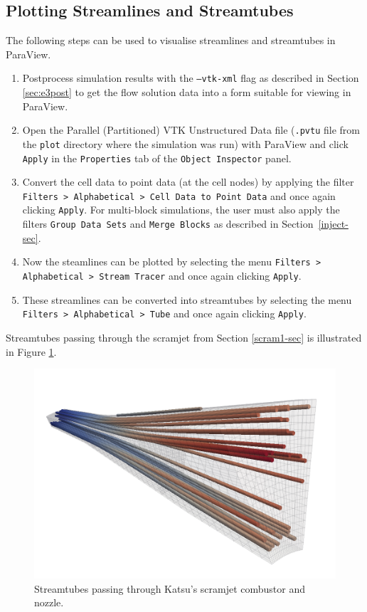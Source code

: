 \subsection{Plotting Streamlines and Streamtubes}
The following steps can be used to visualise streamlines and streamtubes in ParaView.
\begin{enumerate}
\item Postprocess simulation results with the \texttt{--vtk-xml} flag as described in 
Section \ref{sec:e3post} to get the flow solution data into a form suitable for viewing in ParaView.
\item Open the Parallel (Partitioned) VTK Unstructured Data file (\texttt{.pvtu} 
file from the \texttt{plot} directory where the simulation was run) with ParaView 
and click \texttt{Apply} in the \texttt{Properties} tab of the \texttt{Object Inspector} panel.
\item Convert the cell data to point data (at the cell nodes) by applying the
filter \texttt{Filters > Alphabetical > Cell Data to Point Data} and 
once again clicking \texttt{Apply}. For multi-block simulations, the user must
also apply the filters \texttt{Group Data Sets} and \texttt{Merge Blocks} as
described in Section~\ref{inject-sec}.
\item Now the steamlines can be plotted by selecting the menu 
\texttt{Filters > Alphabetical > Stream Tracer} and once again clicking \texttt{Apply}.
\item These streamlines can be converted into streamtubes by selecting the menu 
\texttt{Filters > Alphabetical > Tube} and once again clicking \texttt{Apply}.
\end{enumerate}
Streamtubes passing through the scramjet from Section \ref{scram1-sec} is illustrated 
in Figure \ref{fig:scram-tubes}.
\begin{figure}[htbp]
\begin{center}
\includegraphics[width=12cm]{../3D/scramjet-1/scramjet-streamtubes.png}
\end{center}
\caption{Streamtubes passing through Katsu's scramjet combustor and nozzle.}
\label{fig:scram-tubes}
\end{figure}


